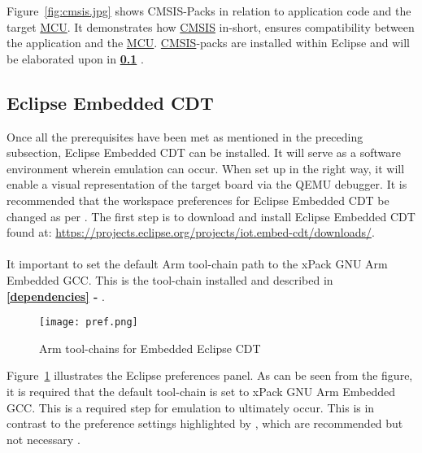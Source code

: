 Figure~\ref{fig:cmsis.jpg} shows CMSIS-Packs in relation to application code and the target \hyperref[listAbr]{MCU}. It demonstrates how \hyperref[listAbr]{CMSIS} in-short, ensures compatibility between the application and the \hyperref[listAbr]{MCU}. \hyperref[listAbr]{CMSIS}-packs are installed within Eclipse and will be elaborated upon in \textbf{\ref{eclipse} }.
\subsection{Eclipse Embedded CDT}
\label{eclipse}
Once all the prerequisites have been met as mentioned in the preceding subsection, Eclipse Embedded CDT can be installed. It will serve as a software environment wherein emulation can  occur. When set up in the right way, it will enable a visual representation of the target board via the QEMU debugger. It is recommended that the workspace preferences for Eclipse Embedded CDT be changed as per \textbf{}. The first step is to download and install Eclipse Embedded CDT found at: \color{blue}\url{https://projects.eclipse.org/projects/iot.embed-cdt/downloads/}\color{black}.
\\\\
It important to set the default Arm tool-chain path to the xPack GNU Arm Embedded GCC. This is the tool-chain installed and described in \textbf{\ref{dependencies}  -  }.
\begin{figure}[H]
\begin{center}
\texttt{[image: pref.png]}
\caption{Arm tool-chains for Embedded Eclipse CDT}
\label{fig:prefArm.jpg}
\end{center}
\end{figure}

Figure~\ref{fig:prefArm.jpg} illustrates the Eclipse preferences panel. As can be seen from the figure, it is required that the default tool-chain is set to xPack GNU Arm Embedded GCC. This is a required step for emulation to ultimately occur. This is in contrast to the preference settings highlighted by \textbf{}, which are recommended but not necessary \cite{eclipseGuide}.

